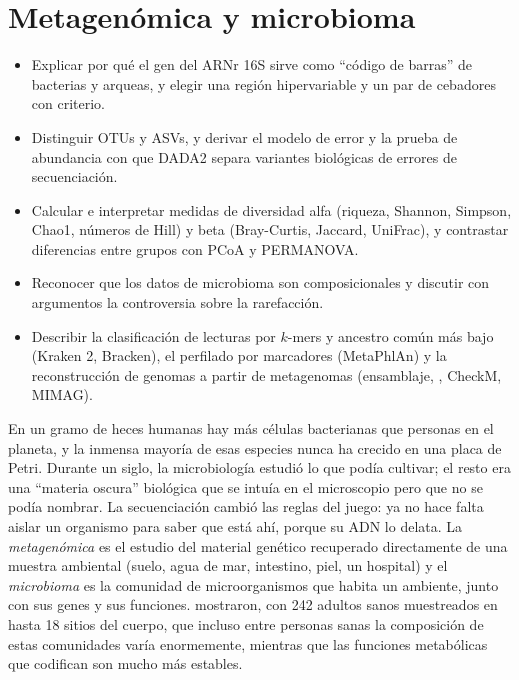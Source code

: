 \chapter{Metagenómica y microbioma}\label{cap:14}


\begin{objetivos}
\begin{itemize}
  \item Explicar por qué el gen del ARNr 16S sirve como ``código de barras'' de bacterias y arqueas, y elegir una región hipervariable y un par de cebadores con criterio.
  \item Distinguir OTUs y ASVs, y derivar el modelo de error y la prueba de abundancia con que DADA2 separa variantes biológicas de errores de secuenciación.
  \item Calcular e interpretar medidas de diversidad alfa (riqueza, Shannon, Simpson, Chao1, números de Hill) y beta (Bray-Curtis, Jaccard, UniFrac), y contrastar diferencias entre grupos con PCoA y PERMANOVA.
  \item Reconocer que los datos de microbioma son composicionales y discutir con argumentos la controversia sobre la rarefacción.
  \item Describir la clasificación de lecturas por $k$-mers y ancestro común más bajo (Kraken 2, Bracken), el perfilado por marcadores (MetaPhlAn) y la reconstrucción de genomas a partir de metagenomas (ensamblaje, , CheckM, MIMAG).
\end{itemize}
\end{objetivos}

En un gramo de heces humanas hay más células bacterianas que personas en el planeta, y la inmensa mayoría de esas especies nunca ha crecido en una placa de Petri. Durante un siglo, la microbiología estudió lo que podía cultivar; el resto era una ``materia oscura'' biológica que se intuía en el microscopio pero que no se podía nombrar. La secuenciación cambió las reglas del juego: ya no hace falta aislar un organismo para saber que está ahí, porque su ADN lo delata. La \emph{metagenómica} es el estudio del material genético recuperado directamente de una muestra ambiental (suelo, agua de mar, intestino, piel, un hospital) y el \emph{microbioma} es la comunidad de microorganismos que habita un ambiente, junto con sus genes y sus funciones. \textcite{c14-hmp2012} mostraron, con 242 adultos sanos muestreados en hasta 18 sitios del cuerpo, que incluso entre personas sanas la composición de estas comunidades varía enormemente, mientras que las funciones metabólicas que codifican son mucho más estables.

